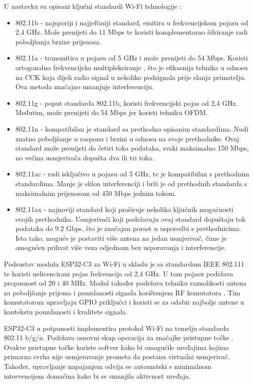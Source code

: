 U nastavku su opisani ključni standardi Wi-Fi tehnologije \cite{how_wifi_works}:
\begin{itemize}
	\item 802.11b - najsporiji i najjeftiniji standard, emitira u frekvencijskom pojasu od 2,4 GHz. Može prenijeti do 11 Mbps te koristi komplementarno šifriranje  radi poboljšanja brzine prijenosa.
	\item 802.11a - transmitira u pojasu od 5 GHz i može prenijeti do 54 Mbps. Koristi ortogonalno frekvencijsko multipleksiranje , što je efikasnija tehnika u odnosu na CCK koja dijeli radio signal u nekoliko podsignala prije slanja primatelju. Ova metoda značajno umanjuje interferenciju. 
	\item 802.11g - poput standarda 802.11b, koristi frekvencijski pojas od 2,4 GHz. Međutim, može prenijeti do 54 Mbps jer koristi tehniku OFDM.
	\item 802.11n - kompatibilan je standard sa prethodno opisanim standardima. Nudi znatno poboljšanje u rasponu i brzini u odnosu na svoje prethodnike. Ovaj standard može prenijeti do četiri toka podataka, svaki maksimalno 150 Mbps, no većina usmjerivača  dopušta dva ili tri toka.
	\item 802.11ac - radi isključivo u pojasu od 5 GHz, te je kompatibilan s prethodnim standardima. Manje je sklon interferenciji i brži je od prethodnih standarda s maksimalnim prijenosom od 450 Mbps jednim tokom. 
	\item 802.11ax - najnoviji standard koji proširuje nekoliko ključnih mogućnosti svojih prethodnika. Usmjerivači koji podržavaju ovaj standard dopuštaju tok podataka do 9.2 Gbps, što je značajan porast u usporedbi s prethodnicima. Isto tako, moguće je postaviti više antena na jedan usmjerivač, čime je omogućen prihvat više veza odjednom bez usporavanja i interferencije.
\end{itemize}

Podsustav modula ESP32-C3 za Wi-Fi u skladu je sa standardom IEEE 802.111 te koristi nelicencirani pojas frekvencija od 2,4 GHz. U tom pojasu podržava propusnost od 20 i 40 MHz. Modul također podržava tehniku raznolikosti antena  za poboljšanje prijema i pouzdanosti signala korištenjem RF komutatora . Tim komutatorom upravljaju GPIO priključci i koristi se za odabir najbolje antene u kontekstu pouzdanosti i kvalitete signala. \cite{esp_mini}

ESP32-C3 u potpunosti implementira protokol Wi-Fi na temelju standarda 802.11 b/g/n. Podržava osnovni skup  operacija za značajke pristupne točke . Ovakve pristupne točke koriste softver kako bi omogućile uređajima kojima primarna svrha nije usmjeravanje prometa da postanu virtualni usmjerivač. \cite{what_is_softap} Također, upravljanje napajanjem odvija se automatski s minimalnom intervencijom domaćina kako bi se smanjila aktivnost uređaja.

